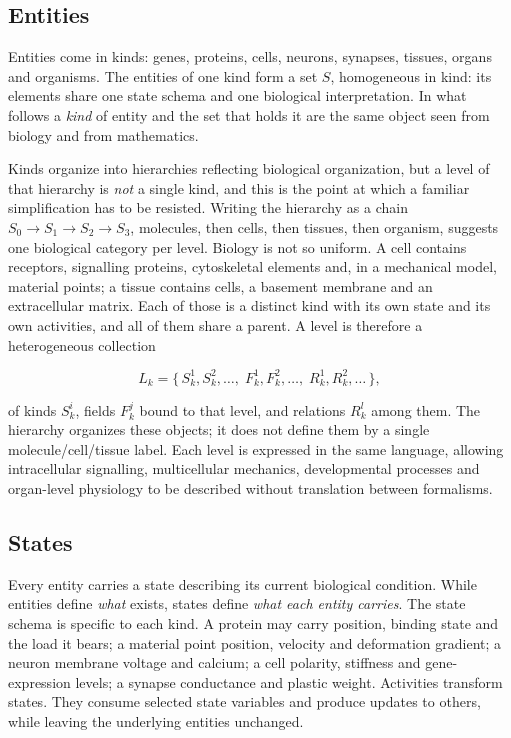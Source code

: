 \documentclass[11pt]{article}
\begin{document}
\subsection{Entities}

Entities come in kinds: genes, proteins, cells, neurons, synapses, tissues, organs and
organisms. The entities of one kind form a set $S$, homogeneous in kind: its elements
share one state schema and one biological interpretation. In what follows a
\emph{kind} of entity and the set that holds it are the same object seen from biology
and from mathematics.

Kinds organize into hierarchies reflecting biological organization, but a level of
that hierarchy is \emph{not} a single kind, and this is the point at which a familiar
simplification has to be resisted. Writing the hierarchy as a chain
$S_0 \to S_1 \to S_2 \to S_3$, molecules, then cells, then tissues, then organism,
suggests one biological category per level. Biology is not so uniform. A cell contains
receptors, signalling proteins, cytoskeletal elements and, in a mechanical model,
material points; a tissue contains cells, a basement membrane and an extracellular
matrix. Each of those is a distinct kind with its own state and its own activities,
and all of them share a parent. A level is therefore a heterogeneous collection

\[
L_k = \{\, S_k^1, S_k^2, \ldots,\; F_k^1, F_k^2, \ldots,\; R_k^1, R_k^2, \ldots \,\},
\]

of kinds $S_k^i$, fields $F_k^j$ bound to that level, and relations $R_k^l$ among
them. The hierarchy organizes these objects; it does not define them by a single
molecule/cell/tissue label. Each level is expressed in the same language, allowing
intracellular signalling, multicellular mechanics, developmental processes and
organ-level physiology to be described without translation between formalisms.

\subsection{States}

Every entity carries a state describing its current biological condition. While
entities define \emph{what} exists, states define \emph{what each entity carries}.
The state schema is specific to each kind. A protein may carry position, binding state
and the load it bears; a material point position, velocity and deformation gradient; a
neuron membrane voltage and calcium; a cell polarity, stiffness and gene-expression
levels; a synapse conductance and plastic weight. Activities transform states. They
consume selected state variables and produce updates to others, while leaving the
underlying entities unchanged.
\end{document}
